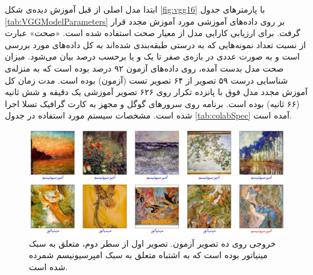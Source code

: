 \documentclass[11pt, twoside]{imsproc}
\let\LTRfootnote\footnoteA
\begin{document}
%
%


ابتدا مدل اصلی از قبل آموزش دیده‌ی
شکل
\ref{fig:vgg16}
با پارمترهای جدول
\ref{tab:VGGModelParameters}
بر روی داده‌های آموزشی مورد آموزش مجدد قرار گرفت.
برای ارزیابی کارایی مدل از معیار صحت%
\LTRfootnote{Accuracy}
استفاده شده است. «صحت» عبارت از نسبت تعداد نمونه‌هایی که به درستی طبقه‌بندی شده‌اند به کل داده‌های مورد بررسی است و به صورت عددی در بازه‌ی صفر تا یک و یا برحسب درصد بیان می‌شود.
میزان صحت مدل بدست آمده،   روی داده‌های آزمون ۹۲ درصد بوده است که به منزله‌ی شناسایی درست ۵۹ تصویر از ۶۴ تصویر تست (آزمون) بوده است.
مدت زمان کل آموزش مجدد مدل فوق با پانزده تکرار روی ۶۲۶ تصویر آموزشی یک دقیقه و شش ثانیه (۶۶ ثانیه) بوده است. برنامه‌ روی سرورهای گوگل و مجهز به کارت گرافیک تسلا اجرا شده است. مشخصات سیستم مورد استفاده در جدول
\ref{tab:colabSpec}
آمده است.

\begin{figure}[t]
\centering
\includegraphics[width=1\linewidth]{images/output4.jpg}
\caption{
خروجی روی ده تصویر آزمون. تصویر اول از سطر دوم، متعلق به سبک مینیاتور بوده است که به اشتباه متعلق به سبک امپرسیونیسم شمرده شده است.
}
\label{fig:output}
\end{figure}
\end{document}
